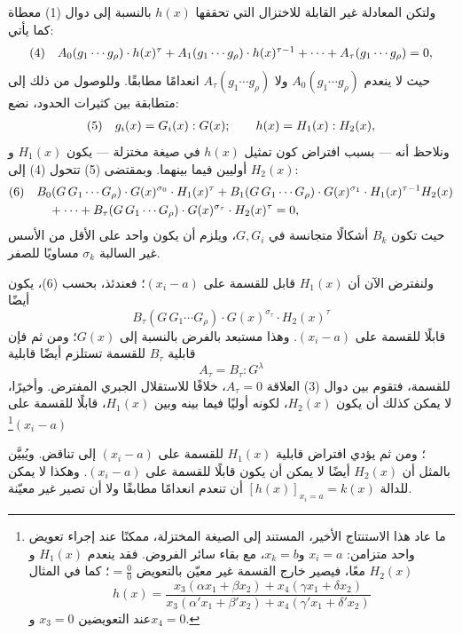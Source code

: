 \documentclass[11pt]{article}
\newcommand{\srcLTR}[1]{\relax\ifmmode\text{\mbox{\babelsublr{\foreignlanguage{english}{#1}}}}\else\babelsublr{\foreignlanguage{english}{#1}}\fi}
\newcommand{\srcfn}[2]{\begingroup\renewcommand{\thefootnote}{\srcLTR{#1}}\footnote{#2}\addtocounter{footnote}{-1}\endgroup}
\begin{document}
ولتكن المعادلة غير القابلة للاختزال التي تحققها $h(x)$ بالنسبة إلى دوال (1) معطاة كما يأتي:
\[
\begin{array}{@{}r@{\quad}l@{}}
(4)& A_0(g_1\cdots g_\rho)\cdot h(x)^\tau
 +A_1(g_1\cdots g_\rho)\cdot h(x)^{\tau-1}
 +\cdots+A_\tau(g_1\cdots g_\rho)=0,
\end{array}
\]
حيث لا ينعدم $A_0(g_1\cdots g_\rho)$ ولا $A_\tau(g_1\cdots g_\rho)$ انعدامًا مطابقًا. وللوصول من ذلك إلى متطابقة بين كثيرات الحدود، نضع:
\[
\begin{array}{@{}r@{\quad}l@{}}
(5)& g_i(x)=G_i(x):G(x);\qquad h(x)=H_1(x):H_2(x),
\end{array}
\]
ونلاحظ أنه --- بسبب افتراض كون تمثيل $h(x)$ في صيغة مختزلة --- يكون $H_1(x)$ و$H_2(x)$ أوليين فيما بينهما. وبمقتضى (5) تتحول (4) إلى:
\[
\begin{array}{@{}r@{\quad}l@{}}
(6)& \begin{aligned}[t]
&B_0(G\,G_1\cdots G_\rho)\cdot G(x)^{\sigma_0}\cdot H_1(x)^\tau
+B_1(G\,G_1\cdots G_\rho)\cdot G(x)^{\sigma_1}\cdot H_1(x)^{\tau-1}H_2(x)\\
&\quad+\cdots+B_\tau(G\,G_1\cdots G_\rho)\cdot G(x)^{\sigma_\tau}\cdot H_2(x)^\tau=0,
\end{aligned}
\end{array}
\]
حيث تكون $B_k$ أشكالًا متجانسة في $G,G_i$، ويلزم أن يكون واحد على الأقل من الأسس غير السالبة $\sigma_k$ مساويًا للصفر.

ولنفترض الآن أن $H_1(x)$ قابل للقسمة على $(x_i-a)$؛ فعندئذ، بحسب (6)، يكون أيضًا
\[
  B_\tau(G\,G_1\cdots G_\rho)\cdot G(x)^{\sigma_\tau}\cdot H_2(x)^\tau
\]
قابلًا للقسمة على $(x_i-a)$. وهذا مستبعد بالفرض بالنسبة إلى $G(x)$؛ ومن ثم فإن قابلية $B_\tau$ للقسمة تستلزم أيضًا قابلية
\[
  A_\tau=B_\tau:G^\lambda
\]
للقسمة، فتقوم بين دوال (3) العلاقة $A_\tau=0$، خلافًا للاستقلال الجبري المفترض.
وأخيرًا، لا يمكن كذلك أن يكون $H_2(x)$، لكونه أوليًا فيما بينه وبين $H_1(x)$، قابلًا للقسمة على $(x_i-a)$\srcfn{*)}{ما عاد هذا الاستنتاج الأخير، المستند إلى الصيغة المختزلة، ممكنًا عند إجراء تعويض واحد متزامن: $x_i=a$ و$x_k=b$، مع بقاء سائر الفروض. فقد ينعدم $H_1(x)$ و$H_2(x)$ معًا، فيصير خارج القسمة غير معيّن بالتعويض $=\frac00$؛ كما في المثال
\[
 h(x)=\frac{x_3(\alpha x_1+\beta x_2)+x_4(\gamma x_1+\delta x_2)}
 {x_3(\alpha' x_1+\beta' x_2)+x_4(\gamma' x_1+\delta' x_2)}
\]
عند التعويضين $x_3=0$ و$x_4=0$.}؛ ومن ثم يؤدي افتراض قابلية $H_1(x)$ للقسمة على $(x_i-a)$ إلى تناقض. ويُبيَّن بالمثل أن $H_2(x)$ أيضًا لا يمكن أن يكون قابلًا للقسمة على $(x_i-a)$. وهكذا لا يمكن للدالة $[h(x)]_{x_i=a}=k(x)$ أن تنعدم انعدامًا مطابقًا ولا أن تصير غير معيّنة.
\end{document}
